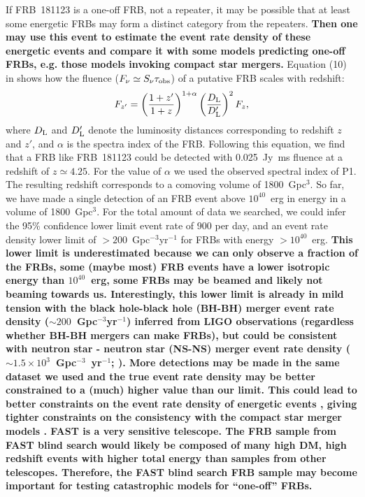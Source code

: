 If FRB~181123 is a one-off FRB, not a repeater, it may be possible that at least some energetic FRBs may form a distinct category from the repeaters. 
{\bf Then one may use this event to estimate the event rate density of these energetic events and compare it with some models predicting one-off FRBs, e.g. those models invoking compact star mergers. }
Equation (10) in \citet{zhang18} shows how the fluence ($F_{\nu}\simeq  S_{\nu}\tau_{\rm obs}$) of a putative FRB scales with redshift: \begin{equation}
    F_{z'} = \left(\frac{1+z'}{1+z}\right)^{1+\alpha}\left(\frac{D_{\rm L}}{D_{\rm L}'}\right)^2F_{z},
\end{equation} 
where $D_{\rm L}$ and $D_{\rm L}'$ denote the luminosity distances corresponding to redshift $z$ and $z'$, and $\alpha$ is the spectra index of the FRB.
Following this equation, we find that a FRB like FRB~181123 could be detected with
0.025~Jy~ms fluence at a redshift of $z\simeq4.25$. 
For the value of $\alpha$ we used the observed spectral index of P1.
The resulting redshift corresponds to a comoving volume of 1800~Gpc$^3$. 
So far, we have made a single detection of an FRB event above $10^{40}$~erg in energy in a volume of 1800~Gpc$^3$. 
For the total amount of data we searched, we could infer the 95\% confidence lower limit event rate of 900 per day, and an event rate density lower limit of $>200$~Gpc$^{-3}$yr$^{-1}$ for FRBs with energy $>10^{40}$~erg. 
{\bf This lower limit is underestimated because we can only observe a fraction of the FRBs, some (maybe most) FRB events have a lower isotropic energy than $10^{40}$~erg, some FRBs may be beamed and likely not beaming towards us. 
Interestingly, this lower limit is already in mild tension with the black hole-black hole (BH-BH) merger event rate density ($\sim 200$~Gpc$^{-3}$yr$^{-1}$) inferred from LIGO observations \citep{mg18} (regardless whether BH-BH mergers can make FRBs), but could be consistent with neutron star - neutron star (NS-NS) merger event rate density ($\sim 1.5\times10^3$~Gpc$^{-3}$~yr$^{-1}$; \citealt{aaa+17}). More detections may be made in the same dataset we used and the true event rate density may be better constrained to a (much) higher value than our limit. This could lead to better constraints on the event rate density of energetic events \citep{lml+20}, giving tighter constraints on the consistency with the compact star merger models \citep[see also][]{wang20}. 
FAST is a very sensitive telescope. The FRB sample from FAST blind search would likely be composed of many high DM, high redshift events with higher total energy than samples from other telescopes. Therefore, the FAST blind search FRB sample may become important for testing catastrophic models for ``one-off'' FRBs.
}

